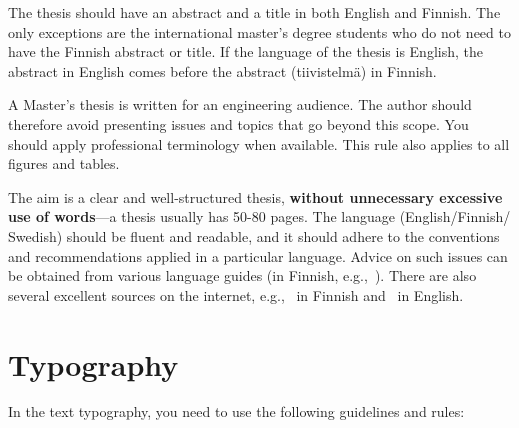 The thesis should have an abstract and a title in both English and Finnish. The only exceptions are the international master’s degree students who do not need to have the Finnish abstract or title. If the language of the thesis is English, the abstract in English comes before the abstract (tiivistelmä) in Finnish.

A Master’s thesis is written for an engineering audience. The author should therefore avoid presenting issues and topics that go beyond this scope. You should apply professional terminology when available. This rule also applies to all figures and tables.

The aim is a clear and well-structured thesis, \textbf{without unnecessary excessive use of words}---a thesis usually has 50-80 pages. The language (English/Finnish/ Swedish) should be fluent and readable, and it should adhere to the conventions and recommendations applied in a particular language. Advice on such issues can be obtained from various language guides (in Finnish, e.g.,~\cite{maamies}). There are also several excellent sources on the internet, e.g.,~\cite{korpela, kielitoimisto} in Finnish and~\cite{reportwriting, englishlanguage} in English.

\section{Typography}

In the text typography, you need to use the following guidelines and rules:

